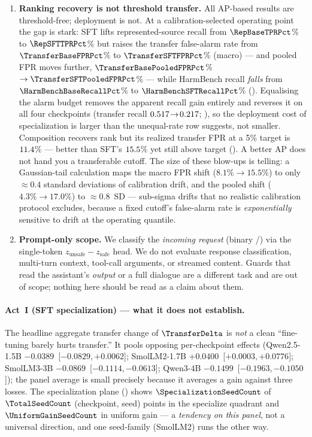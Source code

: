 \begin{enumerate}[leftmargin=1.6em,itemsep=2pt]
  \item \textbf{Ranking recovery is not threshold transfer.} All AP-based results are threshold-free; deployment is not. At a calibration-selected operating point the gap is stark: SFT lifts represented-source recall from $\RepBaseTPRPct$\% to $\RepSFTTPRPct$\% but raises the transfer false-alarm rate from $\TransferBaseFPRPct$\% to $\TransferSFTFPRPct$\% (macro) --- and pooled FPR moves further, $\TransferBasePooledFPRPct$\%$\to\TransferSFTPooledFPRPct$\% --- while HarmBench recall \emph{falls} from $\HarmBenchBaseRecallPct$\% to $\HarmBenchSFTRecallPct$\% (). Equalising the alarm budget removes the apparent recall gain entirely and reverses it on all four checkpoints (transfer recall $0.517\!\to\!0.217$; ), so the deployment cost of specialization is larger than the unequal-rate row suggests, not smaller. Composition recovers rank but its realized transfer FPR at a 5\% target is $11.4$\% --- better than SFT's $15.5$\% yet still above target (). A better AP does not hand you a transferable cutoff. The size of these blow-ups is telling: a Gaussian-tail calculation maps the macro FPR shift ($8.1\%\!\to\!15.5\%$) to only $\approx0.4$ standard deviations of calibration drift, and the pooled shift ($4.3\%\!\to\!17.0\%$) to $\approx0.8$~SD --- sub-sigma drifts that no realistic calibration protocol excludes, because a fixed cutoff's false-alarm rate is \emph{exponentially} sensitive to drift at the operating quantile.

  \item \textbf{Prompt-only scope.} We classify the \emph{incoming request} (binary /) via the single-token $z_{\text{unsafe}}-z_{\text{safe}}$ head. We do not evaluate response classification, multi-turn context, tool-call arguments, or streamed content. Guards that read the assistant's \emph{output} or a full dialogue are a different task and are out of scope; nothing here should be read as a claim about them.
\end{enumerate}

\paragraph{Act~I (SFT specialization) --- what it does not establish.} The headline aggregate transfer change of $\TransferDelta$ is \emph{not} a clean ``fine-tuning barely hurts transfer.'' It pools opposing per-checkpoint effects (Qwen2.5-1.5B $-0.0389$~[$-0.0829,+0.0062$]; SmolLM2-1.7B $+0.0400$~[$+0.0003,+0.0776$]; SmolLM3-3B $-0.0869$~[$-0.1114,-0.0613$]; Qwen3-4B $-0.1499$~[$-0.1963,-0.1050$]); the panel average is small precisely because it averages a gain against three losses. The specialization plane () shows $\SpecializationSeedCount$ of $\TotalSeedCount$ (checkpoint, seed) points in the specialize quadrant and $\UniformGainSeedCount$ in uniform gain --- a \emph{tendency on this panel}, not a universal direction, and one seed-family (SmolLM2) runs the other way.

